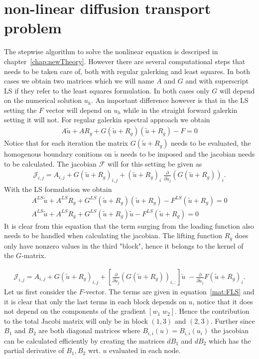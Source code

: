 \section{non-linear diffusion transport problem}
The stepwise algorithm to solve the nonlinear equation is descriped in chapter~\ref{chap:newTheory}. However there are several computational steps that needs to be taken care of, both with regular galerking and least squares. In both cases we obtain two matrices which we will name $A$ and $G$ and with superscript LS if they refer to the least squares formulation. In both cases only $G$ will depend on the numerical solution $u_h$. An important difference however is that in the LS setting the $F$ vector will depend on $u_h$ while in the straight forward galerkin setting it will not. For regular galerkin spectral approach we obtain
%
\begin{align}
	A \tilde{u} + AR_g  + G(\tilde{u}+R_g)(\tilde{u}+R_g) -F = 0
\end{align}
Notice that for each iteration the matrix $G(\tilde{u}+R_g)$ needs to be evaluated, the homogenous boundary conitions on $\tilde{u}$ needs to be imposed and the jacobian needs to be calculated. The jacobian $\mathcal{F}$ will for this setting be given as
%
\begin{align}
	\mathcal{J}_{i,j} = A_{i,j} + G(\tilde{u}+R_g)_{i,j} +  (\tilde{u}+R_g)_i \; \frac{\partial}{\partial \tilde{u}_j} (G(\tilde{u}+R_g))_i.
\end{align}
%
With the LS formulation we obtain
\begin{align}
A^{LS}\tilde{u} + A^{LS}R_g  + G^{LS}(\tilde{u}+R_g)(\tilde{u}+R_g) -F^{LS}(\tilde{u}+R_g) = 0\\
A^{LS}\tilde{u} + A^{LS}R_g  + G^{LS}(\tilde{u}+R_g)\tilde{u} -F^{LS}(\tilde{u}+R_g) = 0
\end{align}
It is clear from this equation that the term surging from the loading function also needs to be handled when calculating the jacobian. The lifting function $R_g$ does only have nonzero values in the third "block", hence it belongs to the kernel of the $G$-matrix.

\begin{align}
	\mathcal{J}_{i,j} = A_{i,j} + G(\tilde{u}+R_g)_{i,j} +  [\frac{\partial}{\partial \tilde{u}_j} (G(\tilde{u}+R_g))_{i,:}] \tilde{u} \; - \frac{\partial}{\partial \tilde{u}_j}F(\tilde{u}+R_g)_i.
\end{align}
%
Let us first consider the $F$-vector. The terms are given in equation~\ref{mat:FLS} and it is clear that only the last terms in each block depends on $u$, notice that it does not depend on the components of the gradient $[ w_1 \; w_2]$. Hence the contribution to the total Jacobi matrix will only be in block $(1,3)$ and $(2,3)$. Further since $B_1$ and $B_2$ are both diagonal matrices where $B_{i,i}(u) = B_{i,i}(u_i)$ the jacobian can be calculated efficiently by creating the matrices $dB_1$ and $dB_2$ which has the partial derivative of $B_1,B_2$ wrt. $u$ evaluated in each node.   




